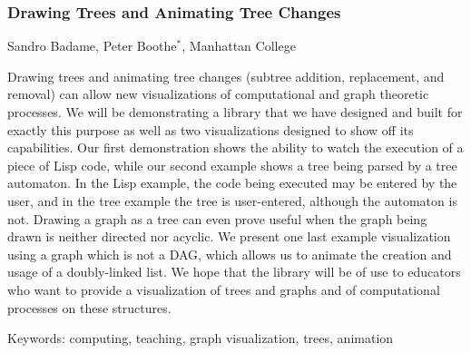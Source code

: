 \documentclass[12pt]{article}
\begin{document}
\subsubsection*{Drawing Trees and Animating Tree Changes}

Sandro Badame, Peter Boothe$^*$, Manhattan College
\medskip

Drawing trees and animating tree changes (subtree addition, replacement, and
removal) can allow new visualizations of computational and graph theoretic
processes.  We will be demonstrating a library that we have designed and built
for exactly this purpose as well as two visualizations designed to show off its
capabilities.  Our first demonstration shows the ability to watch the execution
of a piece of Lisp code, while our second example shows a tree being parsed by
a tree automaton.  In the Lisp example, the code being executed may be entered
by the user, and in the tree example the tree is user-entered, although the
automaton is not.  Drawing a graph as a tree can even prove useful when the
graph being drawn is neither directed nor acyclic.  We present one last
example visualization using a graph which is not a DAG, which allows us to
animate the creation and usage of a doubly-linked list.  We hope that the
library will be of use to educators who want to provide a visualization of
trees and graphs and of computational processes on these structures.  
\medskip

Keywords:  computing, teaching, graph visualization, trees, animation
\end{document}
